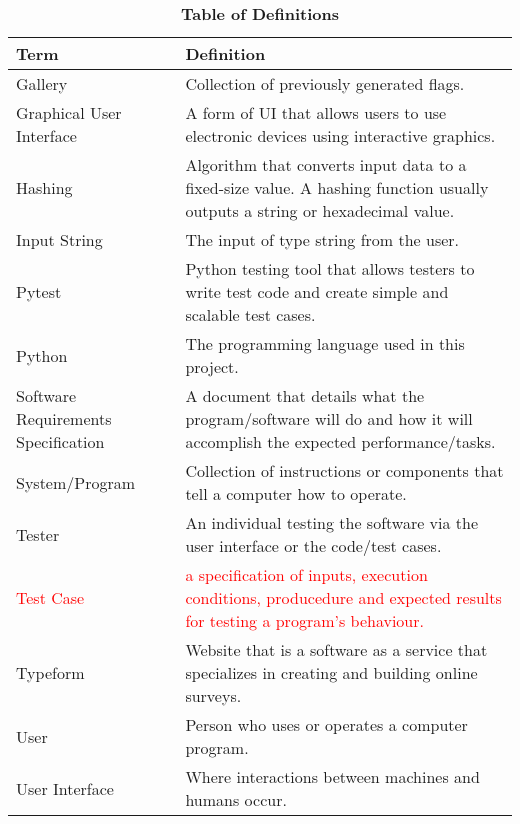 \documentclass[12pt, titlepage]{article}
\newcommand{\newterm}[1]{\label{Term:#1} \MakeUppercase #1}
\begin{document}
\newpage
\begin{table}[htbp]
\caption{\textbf{Table of Definitions}} \label{def}

\begin{tabularx}{\textwidth}{p{3cm}X}
\toprule
\textbf{Term} & \textbf{Definition}\\
\midrule
\newterm{Gallery} & Collection of previously generated flags.\\
\hline
\newterm{Graphical User Interface} & A form of UI that allows users to use
  electronic devices using interactive graphics.\\
\hline
\newterm{Hashing} & Algorithm that converts input data to a fixed-size value.
  A hashing function usually outputs a string or hexadecimal value.\\
\hline
\newterm{Input String} & The input of type string from the user.\\
\hline
\newterm{Pytest} & Python testing tool that allows testers to write test code
  and create simple and scalable test cases.\\
\hline
\newterm{Python} & The programming language used in this project.\\
\hline
\newterm{Software Requirements Specification} & A document that details what
  the program/software will do and how it will accomplish the expected
  performance/tasks.\\
\hline
\newterm{System/Program} & Collection of instructions or components that tell
  a computer how to operate.\\
\hline
\newterm{Tester} & An individual testing the software via the user interface
  or the code/test cases.\\
\hline
\textcolor{red}{\newterm{Test Case}} & \textcolor{red}{a specification of
  inputs, execution conditions, producedure and expected results for testing a
  program's behaviour.}\\
\hline
\newterm{Typeform} & Website that is a software as a service that specializes
  in creating and building online surveys.\\
\hline
\newterm{User} & Person who uses or operates a computer program.\\
\hline
\newterm{User Interface} & Where interactions between machines and humans
  occur.\\
\bottomrule
\end{tabularx}
    
\end{table} 

\newpage
\FloatBarrier
\end{document}
